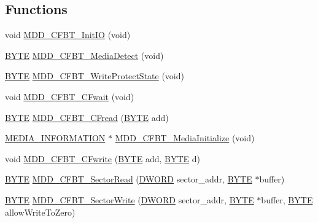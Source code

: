 \subsection*{Functions}
\begin{DoxyCompactItemize}
\item 
void \hyperlink{_c_f-_bit_01transaction_8c_ad8bb829eafee87e07a79cb75c3a40207}{M\+D\+D\+\_\+\+C\+F\+B\+T\+\_\+\+Init\+I\+O} (void)
\item 
\hyperlink{_generic_type_defs_8h_a4ae1dab0fb4b072a66584546209e7d58}{B\+Y\+T\+E} \hyperlink{_c_f-_bit_01transaction_8c_a3e3cb8714ab05c9eb06c1256cb66207e}{M\+D\+D\+\_\+\+C\+F\+B\+T\+\_\+\+Media\+Detect} (void)
\item 
\hyperlink{_generic_type_defs_8h_a4ae1dab0fb4b072a66584546209e7d58}{B\+Y\+T\+E} \hyperlink{_c_f-_bit_01transaction_8c_a5a37a6a14c1346909d87f15e269b95a7}{M\+D\+D\+\_\+\+C\+F\+B\+T\+\_\+\+Write\+Protect\+State} (void)
\item 
void \hyperlink{_c_f-_bit_01transaction_8c_a760749cb805dc17eef5fe99a0c9fb846}{M\+D\+D\+\_\+\+C\+F\+B\+T\+\_\+\+C\+Fwait} (void)
\item 
\hyperlink{_generic_type_defs_8h_a4ae1dab0fb4b072a66584546209e7d58}{B\+Y\+T\+E} \hyperlink{_c_f-_bit_01transaction_8c_aea3f7bb910466bb42e9fcf2aceda94f8}{M\+D\+D\+\_\+\+C\+F\+B\+T\+\_\+\+C\+Fread} (\hyperlink{_generic_type_defs_8h_a4ae1dab0fb4b072a66584546209e7d58}{B\+Y\+T\+E} add)
\item 
\hyperlink{struct_m_e_d_i_a___i_n_f_o_r_m_a_t_i_o_n}{M\+E\+D\+I\+A\+\_\+\+I\+N\+F\+O\+R\+M\+A\+T\+I\+O\+N} $\ast$ \hyperlink{_c_f-_bit_01transaction_8c_abd4c5a1d26d68946be679479a2a5eef0}{M\+D\+D\+\_\+\+C\+F\+B\+T\+\_\+\+Media\+Initialize} (void)
\item 
void \hyperlink{_c_f-_bit_01transaction_8c_afc2cd706413b4c18704118b998c8c6e8}{M\+D\+D\+\_\+\+C\+F\+B\+T\+\_\+\+C\+Fwrite} (\hyperlink{_generic_type_defs_8h_a4ae1dab0fb4b072a66584546209e7d58}{B\+Y\+T\+E} add, \hyperlink{_generic_type_defs_8h_a4ae1dab0fb4b072a66584546209e7d58}{B\+Y\+T\+E} d)
\item 
\hyperlink{_generic_type_defs_8h_a4ae1dab0fb4b072a66584546209e7d58}{B\+Y\+T\+E} \hyperlink{_c_f-_bit_01transaction_8c_ae551a9db136538043e335b190be37bf0}{M\+D\+D\+\_\+\+C\+F\+B\+T\+\_\+\+Sector\+Read} (\hyperlink{_generic_type_defs_8h_ad342ac907eb044443153a22f964bf0af}{D\+W\+O\+R\+D} sector\+\_\+addr, \hyperlink{_generic_type_defs_8h_a4ae1dab0fb4b072a66584546209e7d58}{B\+Y\+T\+E} $\ast$buffer)
\item 
\hyperlink{_generic_type_defs_8h_a4ae1dab0fb4b072a66584546209e7d58}{B\+Y\+T\+E} \hyperlink{_c_f-_bit_01transaction_8c_a81f63cd1faa8e11e6efc392ade8f31d0}{M\+D\+D\+\_\+\+C\+F\+B\+T\+\_\+\+Sector\+Write} (\hyperlink{_generic_type_defs_8h_ad342ac907eb044443153a22f964bf0af}{D\+W\+O\+R\+D} sector\+\_\+addr, \hyperlink{_generic_type_defs_8h_a4ae1dab0fb4b072a66584546209e7d58}{B\+Y\+T\+E} $\ast$buffer, \hyperlink{_generic_type_defs_8h_a4ae1dab0fb4b072a66584546209e7d58}{B\+Y\+T\+E} allow\+Write\+To\+Zero)

\end{DoxyCompactItemize}
